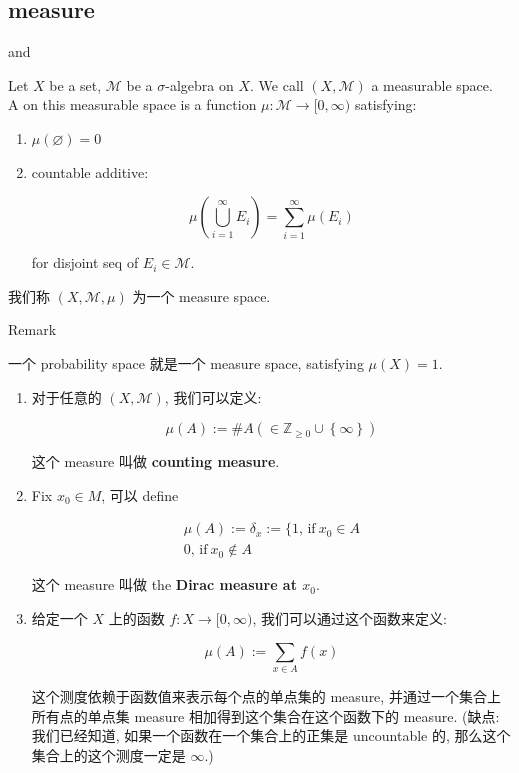 \subsection{measure}\label{measure}

\begin{definition}{ and }

Let \(X\) be a set, \(\mathcal{M}\) be a \(\sigma\)-algebra on \(X\). We call \((X,\mathcal{M})\) a measurable space.\\
A  on this measurable space is a function \(\mu:\mathcal{M}\rightarrow\lbrack 0,\infty)\) satisfying:

\begin{enumerate}
\item
  \(\mu(\varnothing) = 0\)
\item
  countable additive:

  \[\mu(\bigcup\limits_{i = 1}^{\infty}E_{i}) = \sum\limits_{i = 1}^{\infty}\mu(E_{i})\]

  for disjoint seq of \(E_{i} \in \mathcal{M}\).
\end{enumerate}

我们称 \((X,\mathcal{M},\mu)\) 为一个 measure space.

\end{definition}

\begin{qlremark}{Remark}

一个 probability space 就是一个 measure space, satisfying \(\mu(X) = 1\).

\end{qlremark}

\begin{example}

\begin{enumerate}
\item
  对于任意的 \((X,\mathcal{M})\), 我们可以定义:

  \[\mu(A) := \# A( \in \mathbb{Z}_{\geq 0} \cup \left\{ \infty \right\})\]

  这个 measure 叫做 \textbf{counting measure}.
\item
  Fix \(x_{0} \in M\), 可以 define

  \[\begin{matrix}
  {\mu(A) := \delta_{x} := \{ 1\text{, if}\ x_{0} \in A} \\
  {0\text{, if}\ x_{0} \notin A}
  \end{matrix}\]

  这个 measure 叫做 the \textbf{Dirac measure at \(x_{0}\)}.
\item
  给定一个 \(X\) 上的函数 \(f:X\rightarrow\lbrack 0,\infty)\), 我们可以通过这个函数来定义:

  \[\mu(A) := \sum\limits_{x \in A}f(x)\]

  这个测度依赖于函数值来表示每个点的单点集的 measure, 并通过一个集合上所有点的单点集 measure 相加得到这个集合在这个函数下的 measure. (缺点: 我们已经知道, 如果一个函数在一个集合上的正集是 uncountable 的, 那么这个集合上的这个测度一定是 \(\infty\).)
\end{enumerate}

\end{example}


